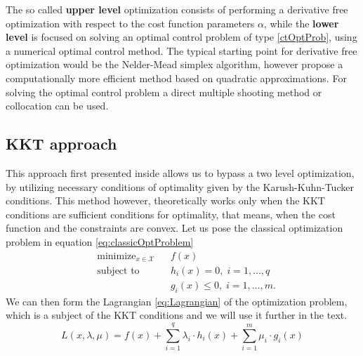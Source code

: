 \documentclass[12pt, a4paper]{article}
\DeclareMathOperator*{\minimize}{minimize}
\begin{document}
The so called \textbf{upper level} optimization consists of performing a derivative free optimization with respect to the cost function parameters \( \alpha\),  while the \textbf{lower level} is focused on solving an optimal control problem of type \eqref{ctOptProb}, using a numerical optimal control method. The typical starting point for derivative free optimization would be the Nelder-Mead simplex algorithm, however \cite{mombaur2010human} propose a computationally more efficient method based on quadratic approximations. For solving the optimal control problem a direct multiple shooting method or collocation can be used.\par

\subsection{KKT approach} \label{KKT approach}
This approach first presented inside \cite{keshavarz2011imputing} allows us to bypass a two level optimization, by utilizing necessary conditions of optimality given by the Karush-Kuhn-Tucker conditions. This method however, theoretically works only when the KKT conditions are sufficient conditions for optimality, that means, when the cost function and the constraints are convex. Let us pose the classical optimization problem in equation \eqref{eq:classicOptProblem} 
\begin{equation} \label{eq:classicOptProblem}
\begin{aligned}
    & \minimize_{x\in\mathcal{X}}   &   &f(x) \\
    & \text{subject to} &   &h_i(x) = 0, \; i = 1,\ldots,q \\
    &                   &   &g_i(x) \leq 0, \; i = 1,\ldots,m.
\end{aligned}
\end{equation}
We can then form the Lagrangian \eqref{eq:Lagrangian} of the optimization problem, which is a subject of the KKT conditions and we will use it further in the text.
\begin{equation} \label{eq:Lagrangian}
    L(x, \lambda, \mu) = f(x) + \sum_{i=1}^q \lambda_i \cdot h_i(x) + \sum_{i=1}^m \mu_i \cdot g_i(x)
\end{equation}

\end{document}
